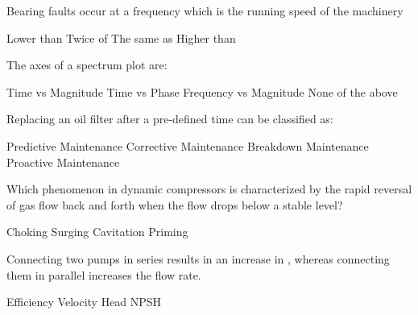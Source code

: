 \documentclass[12pt]{exam}
\begin{document}
     	\renewcommand*\thechoice{\alph{choice}} 
			\renewcommand*\choicelabel{\thechoice)}
        \setcounter{question}{0}
        \begin{questions}           

               \question Bearing faults occur at a frequency which is \makebox[1in]{\hrulefill} the running speed of the machinery \\
                    \begin{oneparchoices}
                        \choice Lower than
                        \choice Twice of
                        \choice The same as
                        \choice Higher than
                    \end{oneparchoices}
                
                \question The axes of a spectrum plot are: \\
                    \begin{oneparchoices}
                        \choice Time vs Magnitude
                        \choice Time vs Phase
                        \choice Frequency vs Magnitude
                        \choice None of the above
                    \end{oneparchoices}
                
                \question Replacing an oil filter after a pre-defined time can be classified as: \\
                    \begin{oneparchoices}
                        \choice Predictive Maintenance
                        \choice Corrective Maintenance
                        \choice Breakdown Maintenance
                        \choice Proactive Maintenance
                    \end{oneparchoices}

                \question Which phenomenon in dynamic compressors is characterized by the rapid reversal of gas flow back and forth when the flow drops below a stable level? \\ %
                    \begin{oneparchoices}
                        \choice Choking
                        \choice Surging %
                        \choice Cavitation
                        \choice Priming
                    \end{oneparchoices}
                
                \question Connecting two pumps in series results in an increase in \makebox[1.8in]{\hrulefill}, whereas connecting them in parallel increases the flow rate. \\ %
                    \begin{oneparchoices}
                        \choice Efficiency
                        \choice Velocity
                        \choice Head %
                        \choice NPSH
                    \end{oneparchoices}
                

\end{questions}
\end{document}
